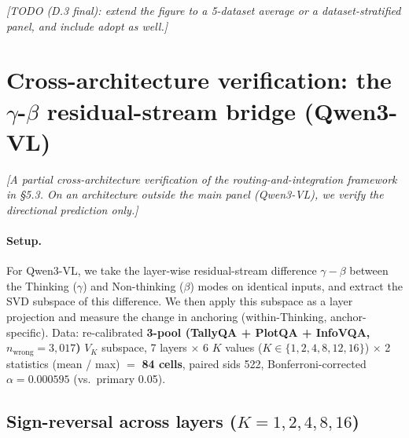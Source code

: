 \documentclass[11pt]{article}
\newcommand{\todoNote}[1]{\textit{\textcolor[rgb]{0.45,0.45,0.45}{[#1]}}}
\begin{document}
\todoNote{TODO (D.3 final): extend the figure to a 5-dataset average or a dataset-stratified panel, and include adopt as well.}

\section{Cross-architecture verification: the $\gamma$-$\beta$ residual-stream bridge (Qwen3-VL)}
\label{app:gamma-beta}

\todoNote{A partial cross-architecture verification of the routing-and-integration framework in \S5.3. On an architecture outside the main panel (Qwen3-VL), we verify the \textit{directional} prediction only.}

\paragraph{Setup.} For Qwen3-VL, we take the layer-wise residual-stream difference $\gamma - \beta$ between the Thinking ($\gamma$) and Non-thinking ($\beta$) modes on identical inputs, and extract the SVD subspace of this difference. We then apply this subspace as a layer projection and measure the change in anchoring (within-Thinking, anchor-specific). Data: re-calibrated \textbf{3-pool (TallyQA + PlotQA + InfoVQA, $n_\text{wrong} = 3{,}017$)} $V_K$ subspace, 7 layers $\times$ 6 $K$ values ($K \in \{1, 2, 4, 8, 12, 16\}$) $\times$ 2 statistics (mean / max) $=$ \textbf{84 cells}, paired sids 522, Bonferroni-corrected $\alpha = 0.000595$ (vs.\ primary 0.05).

\subsection{Sign-reversal across layers ($K=1, 2, 4, 8, 16$)}
\end{document}
